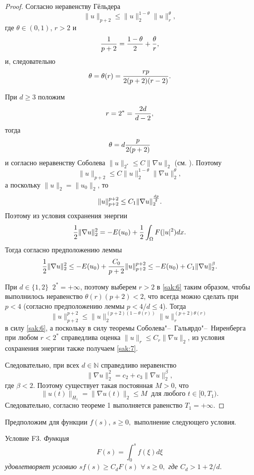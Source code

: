 \begin{proof}
Согласно неравенству Гёльдера
\begin{equation}
\|u\|_{p+2}\leq \|u\|_{2}^{{1-\theta}}\|u\|_{r}^{\theta },
\label{sak:6}
\end{equation}
где  $\theta \in (0, 1)$, $r>2$ и $${1\over {p+2}}={{1-\theta }\over  2}+{{\theta }\over {r}},$$ и, следовательно  $$\theta =\theta (r) ={{rp}\over {2(p+2)(r-2)}}.$$ 

При $d\geq 3$ положим $$r=2^*={{2d}\over {d-2}},$$ тогда $$\theta =d{p\over {2(p+2)}}$$ и согласно неравенству Соболева  $\|u\|_{2^{*}}\leq C\|\nabla
u\|_{2}$ (см. \cite{Nikol's}).   Поэтому
$$
\|u\|_{p+2}\leq C\|u\|_{2}^{{1-\theta}}\|\nabla u\|_{2}^{\theta },
$$
а поскольку $\|u\|_{2}=\|u_{0}\|_{2}$, то
$$
\|u\|_{p+2}^{p+2}\leq C_{1}\|\nabla u\|_{2}^{{{dp}\over 2} }.
$$
Поэтому из условия сохранения энергии 
$$
{1\over 2}\| \nabla u\|_{2}^{2}=-E(u_{0})+{1\over 2}\int_{\Omega }F(|u|^2)dx.
$$
Тогда согласно предположению леммы
\begin{equation}
{1\over 2}\| \nabla u\|_{2}^{2}\leq -E(u_{0})+{{C_0}\over {p+2}}\|u\|_{p+2}^{p+2}\leq -E(u_{0})+C_{1}\| \nabla u\|_{2}^{\beta}.
\label{sak:7}
\end{equation}

При $d\in \{ 1, 2\}\ $ $2^*=+\infty $, поэтому выберем $r>2$ в \eqref{sak:6} таким образом, чтобы выполнилось неравенство $\theta (r) (p+2)<2$, что всегда можно сделать при $p<4$ (согласно предположению леммы $p<{4/d}\leq 4$). 
Тогда $$\|u\|_{p+2}^{p+2}\leq \|u\|_{2}^{(p+2){(1-\theta(r))}}\|u\|_{r}^{(p+2)\theta (r)}$$ в силу \eqref{sak:6},
а поскольку в силу теоремы Соболева"--~Гальярдо"--~Ниренберга при любом $r<2^* $ справедлива оценка $\|u\|_r\leq C_r\| \nabla u\|_2$, из условия сохранения энергии также получаем \eqref{sak:7}.

Следовательно, при всех $d\in \mathbb  N$ справедливо неравенство $$\| \nabla u\|_{2}^{2}=c_{2}+c_{3}\| \nabla
u\|_{2}^{\beta },$$ где $\beta <2$. Поэтому
существует такая постоянная $M>0$, что $$\|u(t)\|_{H_{1}}=\| \nabla
u(t)\|_{2}\leq M ~\text{ для любого $t\in [0,T_{1})$.} $$ 
Следовательно, согласно теореме 1 выполняется равенство $T_{1}=+\infty .$ 
\end{proof}

\smallskip

Предположим  для функции $f(s)$, $s\geq 0,$ выполнение следующего условия. 

\smallskip

{\small \sc Условие F3.} {\it Функция $$F(s)=\int_0^sf(\xi )d\xi $$ удовлетворяет условию $sf(s)\geq C_dF(s)$ $\forall \ s\geq 0,$ где $C_d>1+{2/d}$}. 

